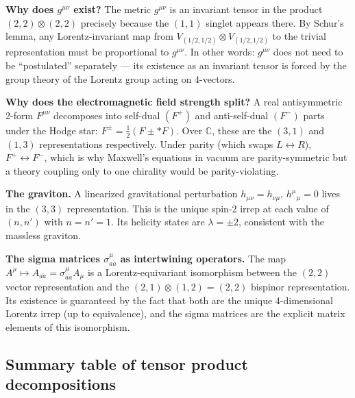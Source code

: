 \begin{physinterp}
  \textbf{Why does $g^{\mu\nu}$ exist?}
  The metric $g^{\mu\nu}$ is an invariant tensor in the product
  $(2,2)\otimes(2,2)$ precisely because the $(1,1)$ singlet appears there.
  By Schur's lemma, any Lorentz-invariant map from $V_{(1/2,1/2)}\otimes V_{(1/2,1/2)}$
  to the trivial representation must be proportional to $g^{\mu\nu}$.
  In other words: $g^{\mu\nu}$ does not need to be ``postulated'' separately ---
  its existence as an invariant tensor is forced by the group theory of the Lorentz
  group acting on 4-vectors.

  \textbf{Why does the electromagnetic field strength split?}
  A real antisymmetric 2-form $F^{\mu\nu}$ decomposes into self-dual $(F^+)$ and
  anti-self-dual $(F^-)$ parts under the Hodge star: $F^{\pm} = \tfrac{1}{2}(F \pm {*F})$.
  Over $\mathbb{C}$, these are the $(3,1)$ and $(1,3)$ representations respectively.
  Under parity (which swaps $L\leftrightarrow R$), $F^+ \leftrightarrow F^-$,
  which is why Maxwell's equations in vacuum are parity-symmetric but a theory
  coupling only to one chirality would be parity-violating.

  \textbf{The graviton.}
  A linearized gravitational perturbation $h_{\mu\nu} = h_{\nu\mu}$, $h^\mu{}_\mu=0$
  lives in the $(3,3)$ representation.  This is the unique spin-2 irrep at each
  value of $(n,n')$ with $n=n'=1$.  Its helicity states are $\lambda = \pm 2$,
  consistent with the massless graviton.

  \textbf{The sigma matrices $\sigma^\mu_{a\dot{a}}$ as intertwining operators.}
  The map $A^\mu \mapsto A_{a\dot{a}} = \sigma^\mu_{a\dot{a}}A_\mu$ is a
  Lorentz-equivariant isomorphism between the $(2,2)$ vector representation and
  the $(2,1)\otimes(1,2) = (2,2)$ bispinor representation.
  Its existence is guaranteed by the fact that both are the unique 4-dimensional
  Lorentz irrep (up to equivalence), and the sigma matrices are the explicit
  matrix elements of this isomorphism.
\end{physinterp}

\subsection{Summary table of tensor product decompositions}

